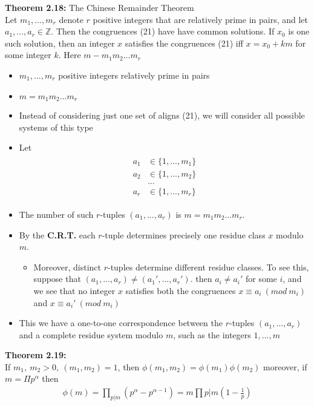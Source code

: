 \documentclass[a4paper]{article}
\begin{document}
\textbf{Theorem 2.18:} The Chinese Remainder Theorem\\
Let $m_1,...,m_r$ denote $r$ positive integers that are relatively prime in pairs, and let $a_1,...,a_r\in\mathbb{Z}$. Then the congruences (21) have have common solutions. If $x_0$ is one such solution, then an integer $x$ satisfies the congruences (21) iff $x=x_0+km$ for some integer $k$. Here $m-m_1m_2...m_r$


\begin{itemize}
    \item $m_1,...,m_r$ positive integers relatively prime in pairs
    \item $m=m_1m_2...m_r$
    \item Instead of considering just one set of aligns (21), we will consider all possible systems of this type
    \item Let
    \begin{align}
        \begin{split}
            a_1&\in\{1,...,m_1\}\\
            a_2&\in\{1,...,m_2\}\\
            &...\\
            a_r&\in\{1,...,m_r\}
        \end{split}
    \end{align}
    \item The number of such $r$-tuples $(a_1,...,a_r)$ is $m=m_1m_2...m_r$.
    \item By the \textbf{C.R.T.} each $r$-tuple determines precisely one residue class $x$ modulo $m$.
    \begin{itemize}
        \item Moreover, distinct $r$-tuples determine different residue classes. To see this, suppose that $(a_1,...,a_r)\neq(a_1',...,a_r')$. then $a_i\neq a_i'$ for some $i$, and we see that no integer $x$ satisfies both the congruences $x\equiv a_i\ (mod\ m_i)$ and $x\equiv a_i'\ (mod\ m_i)$
    \end{itemize}
    \item This we have a one-to-one correspondence between the $r$-tuples $(a_1,...,a_r)$ and a complete residue system modulo $m$, such as the integers $1,...,m$
\end{itemize}

\textbf{Theorem 2.19:}\\
If $m_1,\ m_2>0,\ (m_1,m_2)=1$, then $\phi(m_1,m_2)=\phi(m_1)\phi(m_2)$ moreover, if $m=\Pi p^\alpha$ then
\begin{align}
    \phi(m)=\prod_{p|m}(p^\alpha-p^{\alpha-1})=m\prod{p|m}(1-\frac{1}{p})
\end{align}
\end{document}

